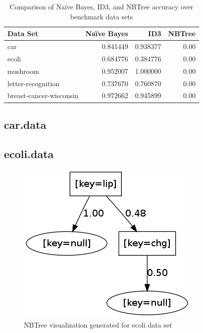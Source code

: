 \documentclass[10pt]{report}
\begin{document}
\begin{table}[h]
  \centering
  \begin{tabular}{ |l|r|r|r|} 
    \hline
    \textbf{Data Set} & \textbf{Na\"{i}ve Bayes} & \textbf{ID3} & \textbf{NBTree} \\ \hline
    car                      &  0.841449  &  0.938377  & 0.00 \\ \hline
    ecoli                    &  0.684776  &  0.384776  & 0.00 \\ \hline
    mushroom                 &  0.952007  &  1.000000  & 0.00 \\ \hline
    letter-recognition       &  0.737670  &  0.760870  & 0.00 \\ \hline
    breast-cancer-wisconsin  &  0.972662  &  0.945899  & 0.00 \\ \hline
  \end{tabular}
  \caption{Comparison of Na\"{i}ve Bayes, ID3, and
    NBTree accuracy over benchmark data sets}
  \label{tab:comparison}
\end{table}


\subsection*{car.data}


\subsection*{ecoli.data}
\begin{figure}
  \begin{center}
	\includegraphics[width=!,height=!]{ecoli}
  \end{center}
  \caption{NBTree visualization generated for ecoli data set}
  \label{fig:ecoli}
\end{figure} 
\end{document}
